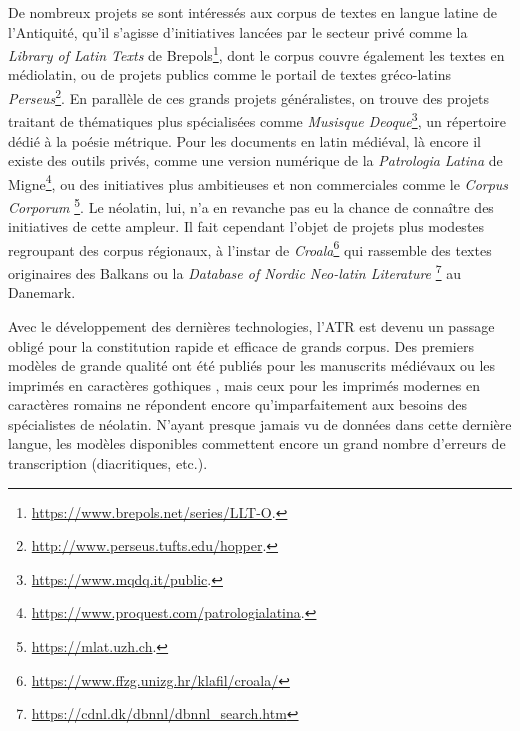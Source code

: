 \documentclass[final, fra]{anthology-ch}      %
\begin{document}
De nombreux projets se sont intéressés aux corpus de textes en langue latine de l'Antiquité, qu'il s'agisse d'initiatives lancées par le secteur privé comme la \textit{Library of Latin Texts} de Brepols\footnote{\url{https://www.brepols.net/series/LLT-O}.},
dont le corpus couvre également les textes en médiolatin, ou de projets publics comme le portail de textes gréco-latins \textit{Perseus}\footnote{\url{http://www.perseus.tufts.edu/hopper}.}. En parallèle de ces grands projets généralistes, on trouve des projets traitant de thématiques plus spécialisées comme \textit{Musisque Deoque}\footnote{\url{https://www.mqdq.it/public}.}, un répertoire dédié à la poésie métrique. Pour les documents en latin médiéval, là encore il existe des outils privés, comme une version numérique de la \textit{Patrologia Latina} de Migne\footnote{\url{https://www.proquest.com/patrologialatina}.}, ou des initiatives plus ambitieuses et non commerciales comme le \textit{Corpus Corporum} \footnote{\url{https://mlat.uzh.ch}.}. Le néolatin, lui, n'a en revanche pas eu la chance de connaître des initiatives de cette ampleur. Il fait cependant l'objet de projets plus modestes regroupant des corpus régionaux, à l'instar de \textit{Croala}\footnote{\url{https://www.ffzg.unizg.hr/klafil/croala/}} qui rassemble des textes originaires des Balkans ou la \textit{Database of Nordic Neo-latin Literature} \footnote{\url{https://cdnl.dk/dbnnl/dbnnl_search.htm}} au Danemark.


Avec le développement des dernières technologies, l'ATR est devenu un passage obligé pour la constitution rapide et efficace de grands corpus. Des premiers modèles de grande qualité ont été publiés pour les manuscrits médiévaux \cite{pinche:hal-04346939,clerice:hal-04453952} ou les imprimés en caractères gothiques \cite{solfrini:hal-04555002}, mais ceux pour les imprimés modernes en caractères romains \cite{pinche_gallicorpora_2022,gabay:hal-04557457} ne répondent encore qu'imparfaitement aux besoins des spécialistes de néolatin. N'ayant presque jamais vu de données dans cette dernière langue, les modèles disponibles commettent encore un grand nombre d'erreurs de transcription (diacritiques, etc.).
\end{document}
